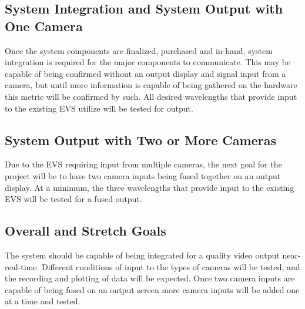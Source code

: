 \documentclass[letterpaper,10pt,serif,draftclsnofoot,onecolumn,compsoc,titlepage]{IEEEtran}
\begin{document}
\subsection{System Integration and System Output with One Camera}

Once the system components are finalized, purchased and in-hand, system integration 
is required for the major components to communicate. This may be capable of being 
confirmed without an output display and signal input from a camera, but until more 
information is capable of being gathered on the hardware this metric will be confirmed 
by such. All desired wavelengths that provide input to the existing EVS utilize will 
be tested for output.\\

\subsection{System Output with Two or More Cameras}

Due to the EVS requiring input from multiple cameras, the next goal for the project 
will be to have two camera inputs being fused together on an output display. At a 
minimum, the three wavelengths that provide input to the existing EVS will be tested 
for a fused output.\\

\subsection{Overall and Stretch Goals}

The system should be capable of being integrated for a quality video output 
near-real-time. Different conditions of input to the types of cameras will be tested, 
and the recording and plotting of data will be expected. Once two camera inputs are 
capable of being fused on an output screen more camera inputs will be added one at a 
time and tested.\\
\end{document}

